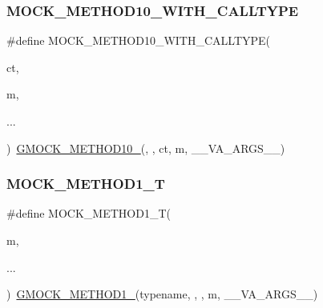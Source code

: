 \mbox{\label{_obj__test_2lib_2googletest-release-1_88_81_2googlemock_2include_2gmock_2gmock-generated-function-mockers_8h_af9641034cbd1f178dacd3515633d951f}} 
\subsubsection{\texorpdfstring{MOCK\_METHOD10\_WITH\_CALLTYPE}{MOCK\_METHOD10\_WITH\_CALLTYPE}}
{\footnotesize\ttfamily \#define M\+O\+C\+K\+\_\+\+M\+E\+T\+H\+O\+D10\+\_\+\+W\+I\+T\+H\+\_\+\+C\+A\+L\+L\+T\+Y\+PE(\begin{DoxyParamCaption}\item[{}]{ct,  }\item[{}]{m,  }\item[{}]{... }\end{DoxyParamCaption})~\mbox{\hyperlink{_obj__test_2lib_2googletest-release-1_88_81_2googlemock_2include_2gmock_2gmock-generated-function-mockers_8h_a81a48223a8771de36ef92ac6d56f6e81}{G\+M\+O\+C\+K\+\_\+\+M\+E\+T\+H\+O\+D10\+\_\+}}(, , ct, m, \+\_\+\+\_\+\+V\+A\+\_\+\+A\+R\+G\+S\+\_\+\+\_\+)}

\mbox{\label{_obj__test_2lib_2googletest-release-1_88_81_2googlemock_2include_2gmock_2gmock-generated-function-mockers_8h_a8e5b9539726be5c7a13f1aa3bcc1f29f}} 
\subsubsection{\texorpdfstring{MOCK\_METHOD1\_T}{MOCK\_METHOD1\_T}}
{\footnotesize\ttfamily \#define M\+O\+C\+K\+\_\+\+M\+E\+T\+H\+O\+D1\+\_\+T(\begin{DoxyParamCaption}\item[{}]{m,  }\item[{}]{... }\end{DoxyParamCaption})~\mbox{\hyperlink{_obj__test_2lib_2googletest-release-1_88_81_2googlemock_2include_2gmock_2gmock-generated-function-mockers_8h_a1bc0012d62440dda77208dabdf4925c9}{G\+M\+O\+C\+K\+\_\+\+M\+E\+T\+H\+O\+D1\+\_\+}}(typename, , , m, \+\_\+\+\_\+\+V\+A\+\_\+\+A\+R\+G\+S\+\_\+\+\_\+)}

